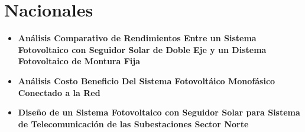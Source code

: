 \section{Nacionales}

\begin{itemize}
    
    \item \textbf{Análisis Comparativo de Rendimientos Entre un Sistema Fotovoltaico con Seguidor Solar de Doble Eje y un Distema Fotovoltaico de Montura Fija \parencite{Laureano}}


    \item \textbf{Análisis Costo Beneficio Del Sistema Fotovoltáico Monofásico Conectado a la Red \parencite{Guevara}}


    \item \textbf{Diseño de un Sistema Fotovoltaico con Seguidor Solar para Sistema de Telecomunicación de las Subestaciones Sector Norte \parencite{Correa}}


\end{itemize}
